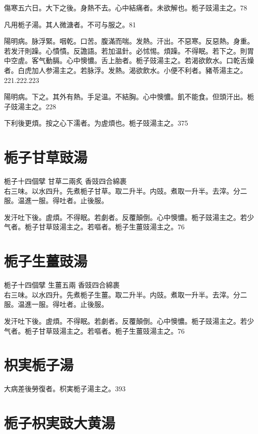 傷寒五六日。大下之後。身熱不去。心中結痛者。未欲解也。栀子{\khaaitp 豉}湯主之。78

凡用栀子湯。其人微溏者。不可与服之。81

陽明病。脉浮緊。咽乾。口苦。腹滿而喘。发熱。汗出。不惡寒。反惡熱。身重。若发汗則躁。心憒憒。反譫語。若加温針。必怵惕。煩躁。不得眠。若下之。則胃中空虗。客气動膈。心中懊憹。舌上胎者。栀子{\khaaitp 豉}湯主之。若渴欲飲水。口乾舌燥者。白虎{\khaaitp 加人参}湯主之。若脉浮。发熱。渴欲飲水。小便不利者。豬苓湯主之。221.222.223

陽明病。下之。其外有熱。手足温。不結胸。心中懊憹。飢不能食。但頭汗出。栀子{\khaaitp 豉}湯主之。228

下利後更煩。按之心下濡者。为虗煩也。栀子{\khaaitp 豉}湯主之。375

\section{栀子甘草豉湯}

栀子{\scriptsize 十四個擘} 甘草{\scriptsize 二兩炙} 香豉{\scriptsize 四合綿裹}\\
右三味。以水四升。先煮栀子甘草。取二升半。内豉。煮取一升半。去滓。分二服。温進一服。得吐者。止後服。

发汗吐下後。虗煩。不得眠。若劇者。反覆顛倒。心中懊憹。栀子{\khaaitp 豉}湯主之。若少气者。栀子甘草{\khaaitp 豉}湯主之。若嘔者。栀子生薑{\khaaitp 豉}湯主之。76

\section{栀子生薑豉湯}

栀子{\scriptsize 十四個擘} 生薑{\scriptsize 五兩} 香豉{\scriptsize 四合綿裹}\\
右三味。以水四升。先煮栀子生薑。取二升半。内豉。煮取一升半。去滓。分二服。温進一服。得吐者。止後服。

发汗吐下後。虗煩。不得眠。若劇者。反覆顛倒。心中懊憹。栀子{\khaaitp 豉}湯主之。若少气者。栀子甘草{\khaaitp 豉}湯主之。若嘔者。栀子生薑{\khaaitp 豉}湯主之。76

\section{枳実栀子湯}

大病差後勞復者。枳実栀子湯主之。393

\section{栀子枳実豉大黄湯}

